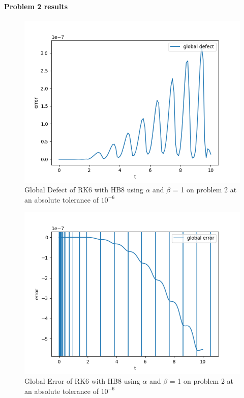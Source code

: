 \documentclass{article}
\begin{document}
\paragraph{Problem 2 results}
\begin{figure}[H]
\centering
\includegraphics[width=0.7\linewidth]{./figures/static_alpha_rk6_with_hb8_p2_global_defect}
\caption{Global Defect of RK6 with HB8 using $\alpha$ and $\beta$ = 1 on problem 2 at an absolute tolerance of $10^{-6}$}
\label{fig:static_alpha_rk6_with_hb8_p2_global_defect}
\end{figure}

\begin{figure}[H]
\centering
\includegraphics[width=0.7\linewidth]{./figures/static_alpha_rk6_with_hb8_p2_global_error}
\caption{Global Error of RK6 with HB8 using $\alpha$ and $\beta$ = 1 on problem 2 at an absolute tolerance of $10^{-6}$}
\label{fig:static_alpha_rk6_with_hb8_p2_global_error}
\end{figure}
\end{document}

